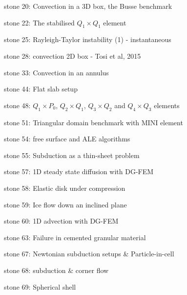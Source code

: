 {\noindent stone 20: Convection in a 3D box, the Busse benchmark \cite{bucc93}


\noindent stone 22: The stabilised $Q_1 \times Q_1$ element 


\noindent stone 25: Rayleigh-Taylor instability (1) - instantaneous \cite{vaks97}


\noindent stone 28: convection 2D box - Tosi et al, 2015


\noindent stone 33: Convection in an annulus 


\noindent stone 44: Flat slab setup 


\noindent stone 48: $Q_1\times P_0$, $Q_2\times Q_1$, $Q_3\times Q_2$ and $Q_4\times Q_3$ elements


\noindent stone 51: Triangular domain benchmark with MINI element


\noindent stone 54: free surface and ALE algorithms


\noindent stone 55: Subduction as a thin-sheet problem


\noindent stone 57: 1D steady state diffusion with DG-FEM


\noindent stone 58: Elastic disk under compression


\noindent stone 59: Ice flow down an inclined plane 


\noindent stone 60: 1D advection with DG-FEM 


\noindent stone 63: Failure in cemented granular material


\noindent stone 67: Newtonian subduction setups \& Particle-in-cell


\noindent stone 68: subduction \& corner flow


\noindent stone 69: Spherical shell 


}









